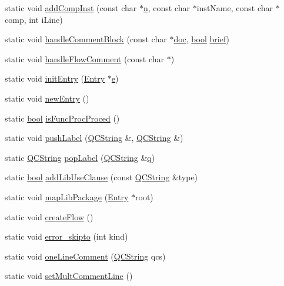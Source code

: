 \begin{DoxyCompactItemize}
\item 
static void \hyperlink{classvhdl_1_1parser_1_1_vhdl_parser_a4c263a0001d3299809648502eadbd2a9}{add\+Comp\+Inst} (const char $\ast$\hyperlink{060__command__switch_8tcl_acdde3cd86eb2421ce8dbb2e85227d368}{n}, const char $\ast$inst\+Name, const char $\ast$comp, int i\+Line)
\item 
static void \hyperlink{classvhdl_1_1parser_1_1_vhdl_parser_a9a0e7180618e2c82d66e54c1343eb8fb}{handle\+Comment\+Block} (const char $\ast$\hyperlink{vhdljjparser_8cpp_a9910424bf5401d657c3b3fdff6fcc152}{doc}, \hyperlink{qglobal_8h_a1062901a7428fdd9c7f180f5e01ea056}{bool} \hyperlink{vhdljjparser_8cpp_a523a0a657a0db3a8f2ffe3d21a9f1289}{brief})
\item 
static void \hyperlink{classvhdl_1_1parser_1_1_vhdl_parser_aa61b79076241620460a6333349cf6aac}{handle\+Flow\+Comment} (const char $\ast$)
\item 
static void \hyperlink{classvhdl_1_1parser_1_1_vhdl_parser_ae19da4fb0229482624a2b01740c4f622}{init\+Entry} (\hyperlink{class_entry}{Entry} $\ast$\hyperlink{060__command__switch_8tcl_aff65a51a703804e0ad1adbcfd76c86f8}{e})
\item 
static void \hyperlink{classvhdl_1_1parser_1_1_vhdl_parser_a984fed01b28f3d04bd83a082d7449b31}{new\+Entry} ()
\item 
static \hyperlink{qglobal_8h_a1062901a7428fdd9c7f180f5e01ea056}{bool} \hyperlink{classvhdl_1_1parser_1_1_vhdl_parser_a4a8fbc9da0bd2a85d9202beec2d70e39}{is\+Func\+Proc\+Proced} ()
\item 
static void \hyperlink{classvhdl_1_1parser_1_1_vhdl_parser_ac92b32a2fa197338035536cd6a16ff8b}{push\+Label} (\hyperlink{class_q_c_string}{Q\+C\+String} \&, \hyperlink{class_q_c_string}{Q\+C\+String} \&)
\item 
static \hyperlink{class_q_c_string}{Q\+C\+String} \hyperlink{classvhdl_1_1parser_1_1_vhdl_parser_a733f1db25d6dede6d00de1230e95bd21}{pop\+Label} (\hyperlink{class_q_c_string}{Q\+C\+String} \&\hyperlink{060__command__switch_8tcl_ab678a0a9a7e94bce5b17141f40220d88}{q})
\item 
static \hyperlink{qglobal_8h_a1062901a7428fdd9c7f180f5e01ea056}{bool} \hyperlink{classvhdl_1_1parser_1_1_vhdl_parser_a8f47c3d08368d2005c67041a15e23696}{add\+Lib\+Use\+Clause} (const \hyperlink{class_q_c_string}{Q\+C\+String} \&type)
\item 
static void \hyperlink{classvhdl_1_1parser_1_1_vhdl_parser_acb249ae71b8fb216a92aa6278ac6e54f}{map\+Lib\+Package} (\hyperlink{class_entry}{Entry} $\ast$root)
\item 
static void \hyperlink{classvhdl_1_1parser_1_1_vhdl_parser_a09fa425522d714bded7144d0c922033e}{create\+Flow} ()
\item 
static void \hyperlink{classvhdl_1_1parser_1_1_vhdl_parser_ae9547049a8237f96043ebda8c55f147f}{error\+\_\+skipto} (int kind)
\item 
static void \hyperlink{classvhdl_1_1parser_1_1_vhdl_parser_a8b128d6b6293f5bedab2e9ccac52fbe3}{one\+Line\+Comment} (\hyperlink{class_q_c_string}{Q\+C\+String} qcs)
\item 
static void \hyperlink{classvhdl_1_1parser_1_1_vhdl_parser_a8af4efbc3df2608a56e12e55ac7b3a3f}{set\+Mult\+Comment\+Line} ()
\end{DoxyCompactItemize}
